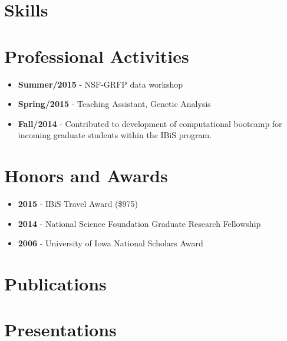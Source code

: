 \documentclass[11pt,a4paper,sans]{moderncv}
\begin{document}
\section{Skills}

\section{Professional Activities}
\begin{itemize}%
\item \textbf{Summer/2015} - NSF-GRFP data workshop
\item \textbf{Spring/2015} - Teaching Assistant, Genetic Analysis
\item \textbf{Fall/2014} - Contributed to development of computational bootcamp for incoming graduate students within the IBiS program.
\end{itemize}

\section{Honors and Awards}
\begin{itemize}%
\item \textbf{2015} - IBiS Travel Award (\$975)
\item \textbf{2014} - National Science Foundation Graduate Research Fellowship 
\item \textbf{2006} - University of Iowa National Scholars Award
\end{itemize}


\newpage
\section{Publications}

\nocite{*}


\printbibliography[type=article,heading=none]
\newpage
\section{Presentations}
\begin{refsection}
\nocite{*}
\printbibliography[type=presentation,heading=none]
\end{refsection}
\end{document}
